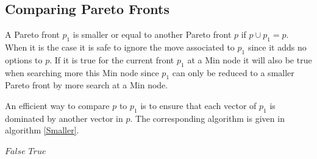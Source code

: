 \documentclass{ecai}
\begin{document}



\subsection{Comparing Pareto Fronts}

A Pareto front $p_1$ is smaller or equal to another Pareto front $p$
if $p \cup p_1 = p$. When it is the case it is safe to ignore the move
associated to $p_1$ since it adds no options to $p$. If it is true for
the current front $p_1$ at a Min node it will also be true when
searching more this Min node since $p_1$ can only be reduced to a
smaller Pareto front by more search at a Min node.

An efficient way to compare $p$ to $p_1$ is to ensure that each vector
of $p_1$ is dominated by another vector in $p$. The corresponding
algorithm is given in algorithm \ref{Smaller}.

\begin{algorithm}
\begin{algorithmic}[1]
\begin{ALC@g}
\ENDIF
\ENDFOR
{}
\RETURN $False$
\ENDIF
\ENDFOR
\RETURN $True$
\end{ALC@g}
\end{algorithmic}
\caption{\label{Smaller}The function to test if a Pareto front is smaller than another one.}
\end{algorithm}

\end{document}
